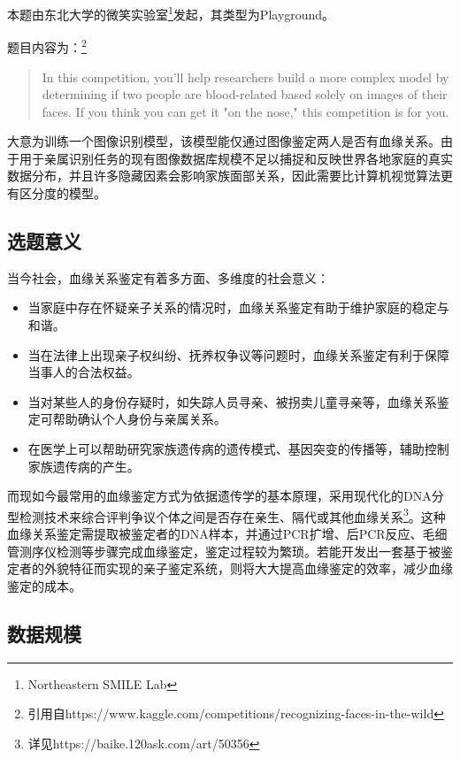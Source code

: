 \documentclass[UTF8]{ctexart}
\begin{document}
本题由东北大学的微笑实验室\footnote{Northeastern SMILE Lab}发起，其类型为Playground。

题目内容为：\footnote{引用自https://www.kaggle.com/competitions/recognizing-faces-in-the-wild}
\begin{quotation}
  In this competition, you’ll help researchers build a more complex model by determining if two people are blood-related based solely on images of their faces. If you think you can get it "on the nose," this competition is for you.
\end{quotation}

大意为训练一个图像识别模型，该模型能仅通过图像鉴定两人是否有血缘关系。由于用于亲属识别任务的现有图像数据库规模不足以捕捉和反映世界各地家庭的真实数据分布，并且许多隐藏因素会影响家族面部关系，因此需要比计算机视觉算法更有区分度的模型。

\subsection{选题意义}
当今社会，血缘关系鉴定有着多方面、多维度的社会意义：
\begin{itemize}
  \item 当家庭中存在怀疑亲子关系的情况时，血缘关系鉴定有助于维护家庭的稳定与和谐。
  \item 当在法律上出现亲子权纠纷、抚养权争议等问题时，血缘关系鉴定有利于保障当事人的合法权益。
  \item 当对某些人的身份存疑时，如失踪人员寻亲、被拐卖儿童寻亲等，血缘关系鉴定可帮助确认个人身份与亲属关系。
  \item 在医学上可以帮助研究家族遗传病的遗传模式、基因突变的传播等，辅助控制家族遗传病的产生。
\end{itemize}

而现如今最常用的血缘鉴定方式为依据遗传学的基本原理，采用现代化的DNA分型检测技术来综合评判争议个体之间是否存在亲生、隔代或其他血缘关系\footnote{详见https://baike.120ask.com/art/50356}。这种血缘关系鉴定需提取被鉴定者的DNA样本，并通过PCR扩增、后PCR反应、毛细管测序仪检测等步骤完成血缘鉴定，鉴定过程较为繁琐。若能开发出一套基于被鉴定者的外貌特征而实现的亲子鉴定系统，则将大大提高血缘鉴定的效率，减少血缘鉴定的成本。

\subsection{数据规模}
\end{document}
